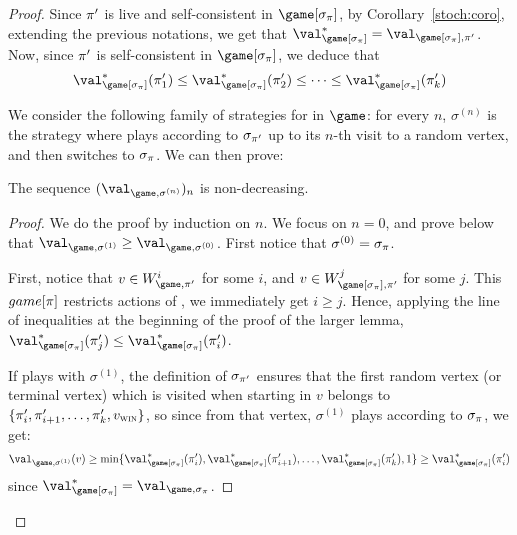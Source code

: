 \begin{proof}%
  Since $\pi'$ is live and self-consistent in $\game[\sigma_\perm]$,
  by Corollary~\ref{stoch:coro}, extending the previous notations, we
  get that
  $\val^*_{\game[\sigma_\perm]} =
  \val_{\game[\sigma_\perm],\perm'}$. Now, since $\pi'$ is
  self-consistent in $\game[\sigma_\perm]$, we deduce that
  \[
    \val^*_{\game[\sigma_\perm]}(\perm'_1) \le
    \val^*_{\game[\sigma_\perm]}(\perm'_2) \le \dots \le
    \val^*_{\game[\sigma_\perm]}(\perm'_k)
  \]

  We consider the following family of strategies for \Eve in $\game$:
  for every $n$, $\sigma^{(n)}$ is the strategy where \Eve plays
  according to $\sigma_{\pi'}$ up to its $n$-th visit to a random
  vertex, and then switches to $\sigma_\pi$. We can then prove:
  \begin{lemma}
    The sequence $(\val_{\game,\sigma^{(n)}})_n$ is non-decreasing.
  \end{lemma}

  \begin{proof}
    We do the proof by induction on $n$.  We focus on $n=0$, and prove
    below that $\val_{\game,\sigma^{(1)}} \ge
    \val_{\game,\sigma^{(0)}}$. First notice that $\sigma^{(0)} =
    \sigma_\pi$.

    First, notice that $v \in W_{\game,\perm'}^i$ for some $i$, and $v
    \in W_{\game[\sigma_\perm],\perm'}^j$ for some $j$. This
    $game[\pi]$ restricts actions of \Eve, we immediately get $i \ge
    j$. Hence, applying the line of inequalities at the beginning of
    the proof of the larger lemma,
    $\val^*_{\game[\sigma_\perm]}(\perm'_j) \le
    \val^*_{\game[\sigma_\perm]}(\perm'_i)$.

    If \Eve plays with $\sigma^{(1)}$, the definition of
    $\sigma_{\pi'}$ ensures that the first random vertex (or
    terminal vertex) which is visited when starting in $v$ belongs to
    $\{\pi'_i,\pi'_{i+1},\dots,\pi'_k,v_{\textsc{win}}\}$, so since from
    that vertex, $\sigma^{(1)}$ plays according to $\sigma_\pi$, we
    get:
    \[
    \val_{\game,\sigma^{(1)}}(v) \ge \min
    \{\val^*_{\game[\sigma_\perm]}(\perm'_i),
    \val^*_{\game[\sigma_\perm]}(\perm'_{i+1}),\dots,
    \val^*_{\game[\sigma_\perm]}(\perm'_k),1\} \ge
    \val^*_{\game[\sigma_\perm]}(\perm'_i)
    \]
    since $\val^*_{\game[\sigma_\perm]} = \val_{\game,\sigma_\perm}$.


\end{proof}
\end{proof}
